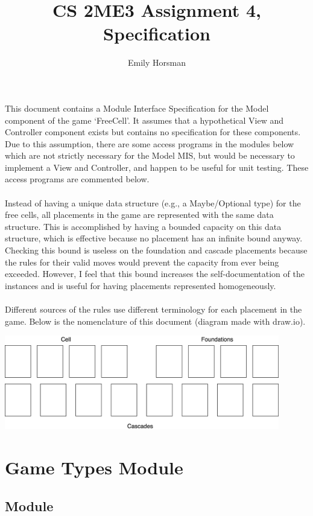 \documentclass[12pt]{article}
\title{CS 2ME3 Assignment 4, Specification}
\author{Emily Horsman}
\begin{document}
\maketitle

This document contains a Module Interface Specification for the Model component
of the game `FreeCell'.
It assumes that a hypothetical View and Controller component exists but
contains no specification for these components.
Due to this assumption, there are some access programs in the modules below
which are not strictly necessary for the Model MIS, but would be necessary to
implement a View and Controller, and happen to be useful for unit testing.
These access programs are commented below.
\\\\
Instead of having a unique data structure (e.g., a Maybe/Optional type) for the
free cells, all placements in the game are represented with the same data
structure.
This is accomplished by having a bounded capacity on this data structure, which
is effective because no placement has an infinite bound anyway.
Checking this bound is useless on the foundation and cascade placements because
the rules for their valid moves would prevent the capacity from ever being
exceeded.
However, I feel that this bound increases the self-documentation of the
instances and is useful for having placements represented homogeneously.
\\\\
Different sources of the rules use different terminology for each placement in
the game. Below is the nomenclature of this document (diagram made with
draw.io).
\begin{center}
\includegraphics[width=0.9\textwidth]{NomenclatureDiagram.png}
\end{center}

\newpage

\section*{Game Types Module}

\subsection*{Module}
\end{document}
